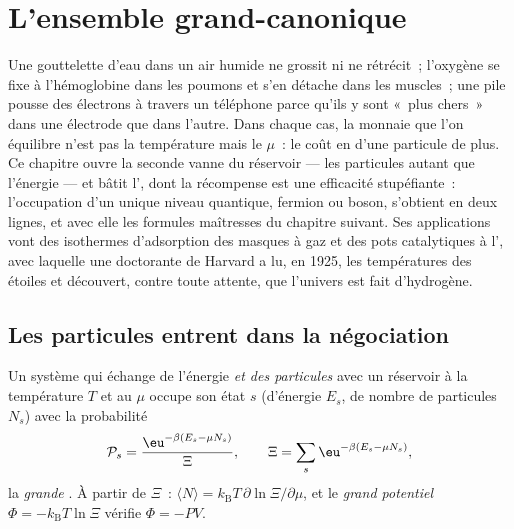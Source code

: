 \chapter{L'ensemble grand-canonique}\label{ch:b3:grand-canonical}

Une gouttelette d'eau dans un air humide ne grossit ni ne rétrécit~;
l'oxygène se fixe à l'hémoglobine dans les poumons et s'en détache
dans les muscles~; une pile pousse des électrons à travers un
téléphone parce qu'ils y sont «~plus chers~» dans une électrode que
dans l'autre. Dans chaque cas, la monnaie que l'on équilibre n'est pas
la température mais le \emph{} $\mu$~: le coût en
 d'une particule de plus. Ce chapitre ouvre la seconde
vanne du réservoir --- les particules autant que l'énergie --- et
bâtit l', dont la récompense est une
efficacité stupéfiante~: l'occupation d'un unique niveau quantique,
fermion ou boson, s'obtient en deux lignes, et avec elle les formules
maîtresses du chapitre suivant. Ses applications vont des isothermes
d'adsorption des masques à gaz et des pots catalytiques à l', avec laquelle une doctorante de Harvard a lu, en 1925, les
températures des étoiles et découvert, contre toute attente, que
l'univers est fait d'hydrogène.

\section{Les particules entrent dans la négociation}

\begin{theorem}\label{thm:b3:grand-canonical:distribution}
Un système qui échange de l'énergie \emph{et des particules} avec un
réservoir à la température $T$ et au  $\mu$ occupe
son état $s$ (d'énergie $E_s$, de nombre de particules $N_s$) avec la
probabilité
\[
\mathcal P_s = \frac{\eu^{-\beta(E_s - \mu N_s)}}{\Xi} , \qquad
\Xi = \sum_s\eu^{-\beta(E_s - \mu N_s)} ,
\]
la \emph{grande }. À partir de $\Xi$~: $\langle N\rangle
= k_{\text{B}}T\,\partial\ln\Xi/\partial\mu$, et le \emph{grand
potentiel} $\Phi = -k_{\text{B}}T\ln\Xi$ vérifie $\Phi = -PV$.
\end{theorem}


